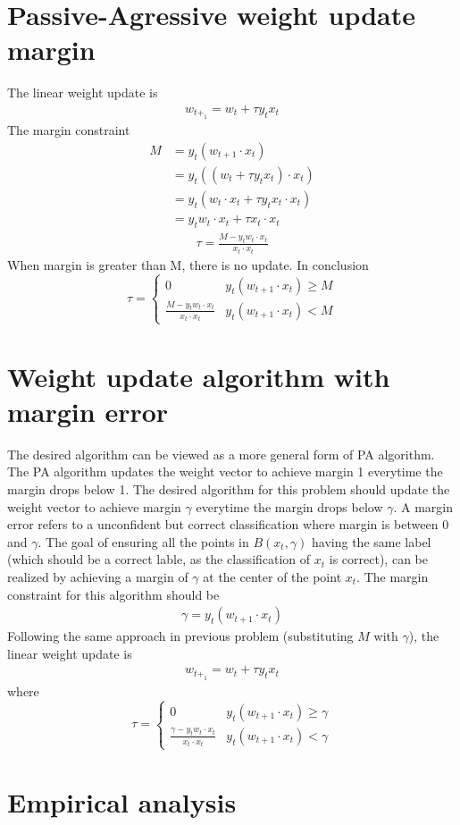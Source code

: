 \documentclass[12pt]{article}
\begin{document}
\section{Passive-Agressive weight update margin}
The linear weight update is
\begin{align}
  w_{t+_1} = w_{t} + \tau y_{t} x_{t}
\end{align}
The margin constraint
\begin{align}
  M
  &= y_{t} (w_{t+1} \cdot x_{t})\\
  &= y_{t} ((w_{t} + \tau y_{t} x_{t}) \cdot x_{t})\\
  &= y_{t} (w_{t} \cdot x_{t} + \tau y_{t} x_{t} \cdot x_{t})\\
  &= y_{t} w_{t} \cdot x_{t} + \tau x_{t} \cdot x_{t}
\end{align}
\begin{align}
  \tau = \frac{M - y_{t} w_{t} \cdot x_{t}}{ x_{t} \cdot x_{t}}
\end{align}
When margin is greater than M, there is no update. In conclusion
\begin{equation}
  \tau =
  \begin{cases}
      0 & y_{t} (w_{t+1} \cdot x_{t}) \geq M \\
      \frac{M - y_{t} w_{t} \cdot x_{t}}{ x_{t} \cdot x_{t}} & y_{t} (w_{t+1} \cdot x_{t}) < M
  \end{cases}
\end{equation}

\section{Weight update algorithm with margin error}
The desired algorithm can be viewed as a more general form of PA algorithm. The PA algorithm updates the weight vector to achieve margin 1 everytime the margin drops below 1. The desired algorithm for this problem should update the weight vector to achieve margin $\gamma$ everytime the margin drops below $\gamma$. A margin error refers to a unconfident but correct classification where margin is between 0 and $\gamma$. The goal of ensuring all the points in $B(x_{t},\gamma)$ having the same label (which should be a correct lable, as the classification of $x_{t}$ is correct), can be realized by achieving a margin of $\gamma$ at the center of the point $x_{t}$. The margin constraint for this algorithm should be
\begin{align}
  \gamma = y_{t} (w_{t+1} \cdot x_{t})
\end{align}
Following the same approach in previous problem (substituting $M$ with $\gamma $), the linear weight update is
\begin{align}
  w_{t+_1} = w_{t} + \tau y_{t} x_{t}
\end{align}
where
\begin{equation}
  \tau =
  \begin{cases}
      0 & y_{t} (w_{t+1} \cdot x_{t}) \geq \gamma  \\
      \frac{\gamma  - y_{t} w_{t} \cdot x_{t}}{ x_{t} \cdot x_{t}} & y_{t} (w_{t+1} \cdot x_{t}) < \gamma 
  \end{cases}
\end{equation}

\section{Empirical analysis}
\end{document}
